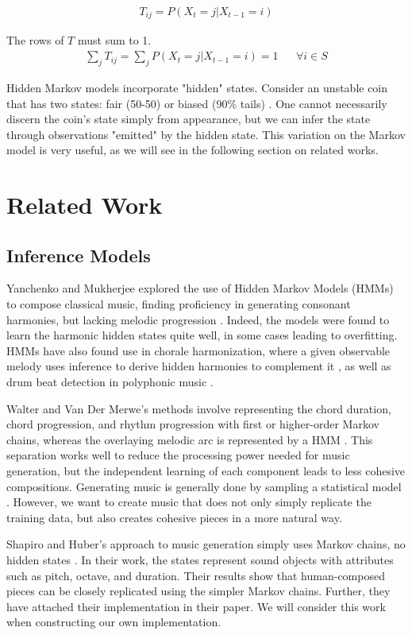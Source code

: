 \documentclass{article}
\begin{document}
\begin{align*}
  T_{ij} = P(X_t = j | X_{t-1} = i)
\end{align*}

The rows of $T$ must sum to 1. 
\begin{align*}
  \sum_{j} T_{ij} = \sum_{j} P(X_t = j | X_{t-1} = i) = 1 && \forall i \in S
\end{align*}

Hidden Markov models incorporate "hidden" states. Consider an unstable coin that has two states: fair (50-50) or biased (90\% tails) \cite{hmms}. One cannot necessarily 
discern the coin's state simply from appearance, but we can infer the state through observations "emitted" by the hidden state. This variation on the Markov model is very 
useful, as we will see in the following section on related works. 

\section{Related Work}
\subsection{Inference Models}
Yanchenko and Mukherjee explored the use of Hidden Markov Models (HMMs) to compose classical music, finding proficiency in generating consonant harmonies, but 
lacking melodic progression \cite{yanchenko_2017}. Indeed, the models were found to learn the harmonic hidden states quite well, in some cases leading to overfitting. 
HMMs have also found use in chorale harmonization, where a given observable melody uses inference to derive hidden harmonies to complement it \cite{allan_2005}, as well 
as drum beat detection in polyphonic music \cite{drum_detection}. 

Walter and Van Der Merwe's methods involve representing the chord duration, chord progression, and rhythm progression with first or higher-order Markov chains, whereas 
the overlaying melodic arc is represented by a HMM \cite{walter_2011}. This separation works well to reduce the processing power needed for music generation, but the 
independent learning of each component leads to less cohesive compositions. Generating music is generally done by sampling a statistical model \cite{conklin_2003}.
However, we want to create music that does not only simply replicate the training data, but also creates cohesive pieces in a more natural way. 

Shapiro and Huber's approach to music generation simply uses Markov chains, no hidden states \cite{shapiro_huber_2021}. In their work, the states represent sound 
objects with attributes such as pitch, octave, and duration. Their results show that human-composed pieces can be closely replicated using the simpler Markov chains. 
Further, they have attached their implementation in their paper. We will consider this work when constructing our own implementation.
\end{document}

